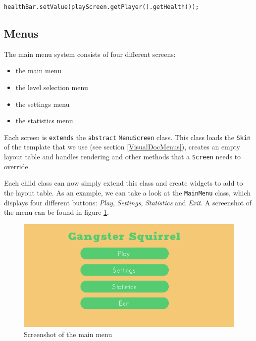 \documentclass[12p]{article}
\begin{document}
\begin{verbatim}
healthBar.setValue(playScreen.getPlayer().getHealth());
\end{verbatim}


\newpage
\subsection{Menus} \label{DocMenus}

The main menu system consists of four different screens:

\begin{itemize}
    \item the main menu
    \item the level selection menu
    \item the settings menu
    \item the statistics menu
\end{itemize}

Each screen is \texttt{extends} the \texttt{abstract} \texttt{MenuScreen} class. This class loads the \texttt{Skin} of the template that we use (see section \ref{VisualDocMenus}), creates an empty layout table and handles rendering and other methods that a \texttt{Screen} needs to override.

Each child class can now simply extend this class and create widgets to add to the layout table. As an example, we can take a look at the \texttt{MainMenu} class, which displays four different buttons: \emph{Play}, \emph{Settings}, \emph{Statistics} and \emph{Exit}. A screenshot of the menu can be found in figure \ref{fig:main_menu_screenshot}.

\begin{figure}[ht]
  \center
  \includegraphics[width=1\textwidth]{Documentation/main_menu.png}
  \caption{Screenshot of the main menu}
  \label{fig:main_menu_screenshot}
\end{figure}
\end{document}
